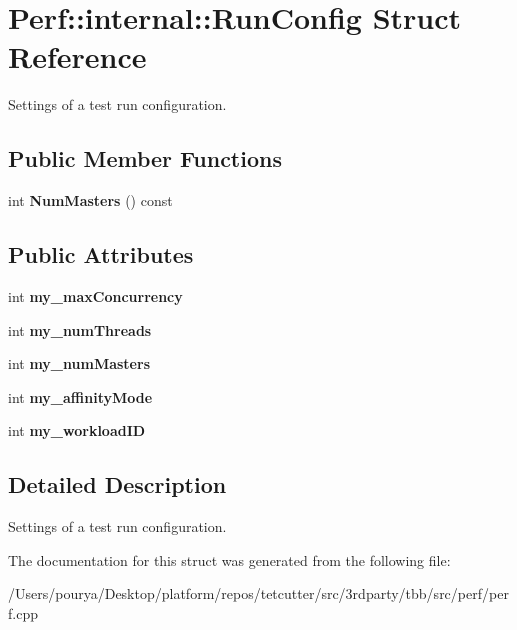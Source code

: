\hypertarget{structPerf_1_1internal_1_1RunConfig}{}\section{Perf\+:\+:internal\+:\+:Run\+Config Struct Reference}
\label{structPerf_1_1internal_1_1RunConfig}


Settings of a test run configuration.  


\subsection*{Public Member Functions}
\begin{DoxyCompactItemize}
\item 
\hypertarget{structPerf_1_1internal_1_1RunConfig_adf5f3348daa3510fda9ff1151af9ff98}{}int {\bfseries Num\+Masters} () const \label{structPerf_1_1internal_1_1RunConfig_adf5f3348daa3510fda9ff1151af9ff98}

\end{DoxyCompactItemize}
\subsection*{Public Attributes}
\begin{DoxyCompactItemize}
\item 
\hypertarget{structPerf_1_1internal_1_1RunConfig_aa2021dd845d611a8066b379479dcf6b2}{}int {\bfseries my\+\_\+max\+Concurrency}\label{structPerf_1_1internal_1_1RunConfig_aa2021dd845d611a8066b379479dcf6b2}

\item 
\hypertarget{structPerf_1_1internal_1_1RunConfig_ad42c1e4544af1cac90a437dd8b95819f}{}int {\bfseries my\+\_\+num\+Threads}\label{structPerf_1_1internal_1_1RunConfig_ad42c1e4544af1cac90a437dd8b95819f}

\item 
\hypertarget{structPerf_1_1internal_1_1RunConfig_a5740e5f988084079104cd4529ba01d1e}{}int {\bfseries my\+\_\+num\+Masters}\label{structPerf_1_1internal_1_1RunConfig_a5740e5f988084079104cd4529ba01d1e}

\item 
\hypertarget{structPerf_1_1internal_1_1RunConfig_a5d173277a44e11d01a7f74df6a48d561}{}int {\bfseries my\+\_\+affinity\+Mode}\label{structPerf_1_1internal_1_1RunConfig_a5d173277a44e11d01a7f74df6a48d561}

\item 
\hypertarget{structPerf_1_1internal_1_1RunConfig_a6c2064c60fdabbd0df6799af66cb4dca}{}int {\bfseries my\+\_\+workload\+I\+D}\label{structPerf_1_1internal_1_1RunConfig_a6c2064c60fdabbd0df6799af66cb4dca}

\end{DoxyCompactItemize}


\subsection{Detailed Description}
Settings of a test run configuration. 

The documentation for this struct was generated from the following file\+:\begin{DoxyCompactItemize}
\item 
/\+Users/pourya/\+Desktop/platform/repos/tetcutter/src/3rdparty/tbb/src/perf/perf.\+cpp\end{DoxyCompactItemize}
